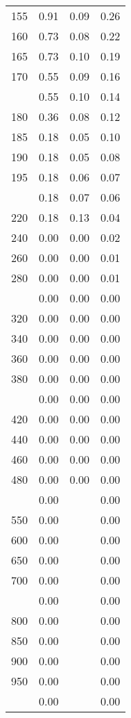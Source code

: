 \begin{table}[ht]
\begin{tabular}{lccc}
  155 & 0.91 & 0.09 & 0.26 \\ 
  160 & 0.73 & 0.08 & 0.22 \\ 
  165 & 0.73 & 0.10 & 0.19 \\ 
  170 & 0.55 & 0.09 & 0.16 \\ 
   \addlinespace
175 & 0.55 & 0.10 & 0.14 \\ 
  180 & 0.36 & 0.08 & 0.12 \\ 
  185 & 0.18 & 0.05 & 0.10 \\ 
  190 & 0.18 & 0.05 & 0.08 \\ 
  195 & 0.18 & 0.06 & 0.07 \\ 
   \addlinespace
200 & 0.18 & 0.07 & 0.06 \\ 
  220 & 0.18 & 0.13 & 0.04 \\ 
  240 & 0.00 & 0.00 & 0.02 \\ 
  260 & 0.00 & 0.00 & 0.01 \\ 
  280 & 0.00 & 0.00 & 0.01 \\ 
   \addlinespace
300 & 0.00 & 0.00 & 0.00 \\ 
  320 & 0.00 & 0.00 & 0.00 \\ 
  340 & 0.00 & 0.00 & 0.00 \\ 
  360 & 0.00 & 0.00 & 0.00 \\ 
  380 & 0.00 & 0.00 & 0.00 \\ 
   \addlinespace
400 & 0.00 & 0.00 & 0.00 \\ 
  420 & 0.00 & 0.00 & 0.00 \\ 
  440 & 0.00 & 0.00 & 0.00 \\ 
  460 & 0.00 & 0.00 & 0.00 \\ 
  480 & 0.00 & 0.00 & 0.00 \\ 
   \addlinespace
500 & 0.00 &  & 0.00 \\ 
  550 & 0.00 &  & 0.00 \\ 
  600 & 0.00 &  & 0.00 \\ 
  650 & 0.00 &  & 0.00 \\ 
  700 & 0.00 &  & 0.00 \\ 
   \addlinespace
750 & 0.00 &  & 0.00 \\ 
  800 & 0.00 &  & 0.00 \\ 
  850 & 0.00 &  & 0.00 \\ 
  900 & 0.00 &  & 0.00 \\ 
  950 & 0.00 &  & 0.00 \\ 
   \addlinespace
1000 & 0.00 &  & 0.00 \\ 
   \bottomrule
\end{tabular}
\end{table}
